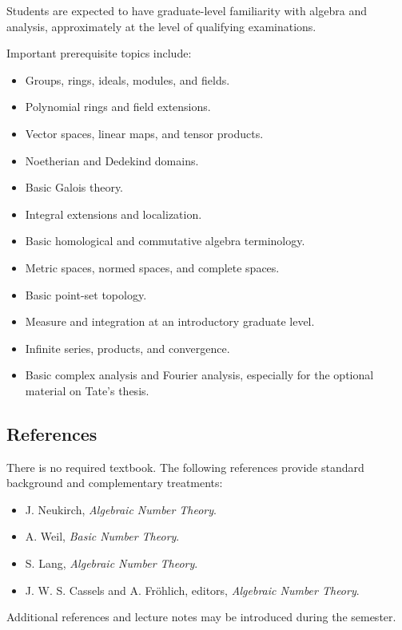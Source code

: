 \documentclass[11pt]{article}
\begin{document}
Students are expected to have graduate-level familiarity with algebra and
analysis, approximately at the level of qualifying examinations.

Important prerequisite topics include:

\begin{itemize}
    \item Groups, rings, ideals, modules, and fields.
    \item Polynomial rings and field extensions.
    \item Vector spaces, linear maps, and tensor products.
    \item Noetherian and Dedekind domains.
    \item Basic Galois theory.
    \item Integral extensions and localization.
    \item Basic homological and commutative algebra terminology.
    \item Metric spaces, normed spaces, and complete spaces.
    \item Basic point-set topology.
    \item Measure and integration at an introductory graduate level.
    \item Infinite series, products, and convergence.
    \item Basic complex analysis and Fourier analysis, especially for the
          optional material on Tate's thesis.
\end{itemize}

\subsection{References}

There is no required textbook. The following references provide standard
background and complementary treatments:

\begin{itemize}
    \item J. Neukirch, \emph{Algebraic Number Theory}.
    \item A. Weil, \emph{Basic Number Theory}.
    \item S. Lang, \emph{Algebraic Number Theory}.
    \item J. W. S. Cassels and A. Fr\"ohlich, editors,
          \emph{Algebraic Number Theory}.
\end{itemize}

Additional references and lecture notes may be introduced during the semester.
\end{document}
